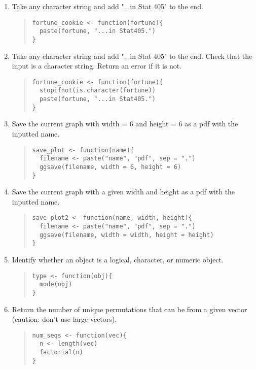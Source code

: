 \documentclass{article}
\begin{document}
\begin{enumerate}
\item Take any character string and add "...in Stat 405" to the end.
  \begin{quote}
    \begin{verbatim}
fortune_cookie <- function(fortune){
  paste(fortune, "...in Stat405.")
}
    \end{verbatim}
  \end{quote}

\item Take any character string and add "...in Stat 405" to the end. Check that the input is a character string. Return an error if it is not.
  \begin{quote}
    \begin{verbatim}
fortune_cookie <- function(fortune){
  stopifnot(is.character(fortune))
  paste(fortune, "...in Stat405.")
}	
    \end{verbatim}
  \end{quote}


\item Save the current graph with width = 6 and height = 6 as a pdf with the inputted name.
  \begin{quote}
    \begin{verbatim}
save_plot <- function(name){
  filename <- paste("name", "pdf", sep = ".")
  ggsave(filename, width = 6, height = 6)
}    
    \end{verbatim}
  \end{quote}

\item Save the current graph with a given width and height as a pdf with the inputted name.
  \begin{quote}
    \begin{verbatim}
save_plot2 <- function(name, width, height){
  filename <- paste("name", "pdf", sep = ".")
  ggsave(filename, width = width, height = height)
}    
    \end{verbatim}
  \end{quote}

\item Identify whether an object is a logical, character, or numeric object.
  \begin{quote}
    \begin{verbatim}
type <- function(obj){
  mode(obj)
}
    \end{verbatim}
  \end{quote}

\item Return the number of unique permutations that can be from a given vector (caution: don't use large vectors).
  \begin{quote}
    \begin{verbatim}
num_seqs <- function(vec){
  n <- length(vec)
  factorial(n)
}    
    \end{verbatim}
  \end{quote}


\end{enumerate}
\end{document}

